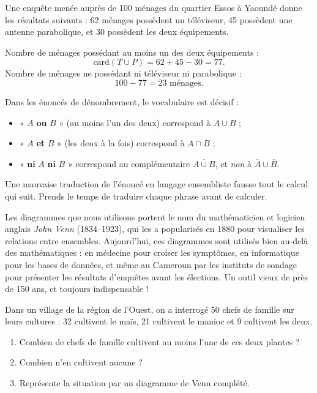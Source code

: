 \documentclass[11pt]{article}
\begin{document}
\begin{exemplebox}
Une enquête menée auprès de 100 ménages du quartier Essos à Yaoundé donne les résultats suivants : 62 ménages possèdent un téléviseur, 45 possèdent une antenne parabolique, et 30 possèdent les deux équipements.

Nombre de ménages possédant au moins un des deux équipements :
\[ \mathrm{card}(T \cup P) = 62 + 45 - 30 = 77. \]
Nombre de ménages ne possédant ni téléviseur ni parabolique :
\[ 100 - 77 = 23 \text{ ménages}. \]
\end{exemplebox}

\begin{attention}
Dans les énoncés de dénombrement, le vocabulaire est décisif :
\begin{itemize}
\item « $A$ \textbf{ou} $B$ » (au moins l'un des deux) correspond à $A \cup B$ ;
\item « $A$ \textbf{et} $B$ » (les deux à la fois) correspond à $A \cap B$ ;
\item « \textbf{ni} $A$ \textbf{ni} $B$ » correspond au complémentaire $\overline{A \cup B}$, et \emph{non} à $\overline{A} \cup \overline{B}$.
\end{itemize}
Une mauvaise traduction de l'énoncé en langage ensembliste fausse tout le calcul qui suit. Prends le temps de traduire chaque phrase avant de calculer.
\end{attention}

\begin{savaistu}
Les diagrammes que nous utilisons portent le nom du mathématicien et logicien anglais \emph{John Venn} (1834--1923), qui les a popularisés en 1880 pour visualiser les relations entre ensembles. Aujourd'hui, ces diagrammes sont utilisés bien au-delà des mathématiques : en médecine pour croiser les symptômes, en informatique pour les bases de données, et même au Cameroun par les instituts de sondage pour présenter les résultats d'enquêtes avant les élections. Un outil vieux de près de 150 ans, et toujours indispensable !
\end{savaistu}

\begin{exercice}
Dans un village de la région de l'Ouest, on a interrogé 50 chefs de famille sur leurs cultures : 32 cultivent le maïs, 21 cultivent le manioc et 9 cultivent les deux.
\begin{enumerate}
\item Combien de chefs de famille cultivent au moins l'une de ces deux plantes ?
\item Combien n'en cultivent aucune ?
\item Représente la situation par un diagramme de Venn complété.
\end{enumerate}
\end{exercice}
\end{document}
